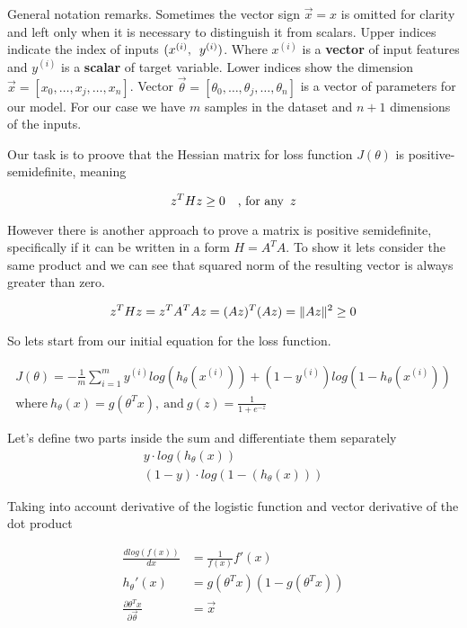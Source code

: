 \documentclass{article}
\DeclarePairedDelimiter{\norm}{\lVert}{\rVert}
\begin{document}
General notation remarks. Sometimes the vector sign $\vec x = x$ is omitted for clarity and left only when it is necessary to distinguish it from scalars. 
Upper indices indicate the index of inputs $(x^{(i)}, \enskip y^{(i)})$. Where $x^{(i)} $ is a {\bf vector} of input features and  $y^{(i)}$ is a {\bf scalar} of target variable.
Lower indices show the dimension  $\vec x = [x_0, \dots, x_j, \dots, x_n]$. Vector $\vec \theta = [\theta_0, \dots, \theta_j, \dots, \theta_n]$ is a vector of parameters for our
model. For our case we have $m$ samples in the dataset and $n + 1$ dimensions of the inputs.

Our task is to proove that the Hessian matrix for loss function $J(\theta)$ is positive-semidefinite, meaning

\[
z^T H z \ge 0
\quad \text {, for any} \enskip z
\]

However there is another approach to prove a matrix is positive semidefinite, specifically if it can be written in a form $H = A^T A$.
To show it lets consider the same product and we can see that squared norm of the resulting vector is always greater than zero.

\[
z^T H z = z^T A^T A z = (Az)^T (Az) = \norm{Az}^2 \ge 0
\]

So lets start from our initial equation for the loss function.

\begin{align}
J(\theta) = - \frac 1m \sum^m_{i=1} y^{(i)} log(h_{\theta}(x^{(i)})) + (1-y^{(i)})log(1-h_{\theta}(x^{(i)})) \\
    \text{where}\ h_{\theta}(x) = g(\theta^Tx),\ \text{and}\ g(z) = \frac{1}{1 + e^{-z}}
\end{align}

Let's define two parts inside the sum and differentiate them separately
\begin{align}
y \cdot log (h_{\theta}(x)) \label{eq:1} \\
(1 - y) \cdot log(1 - (h_{\theta}(x))) \label{eq:2}
\end{align}

Taking into account derivative of the logistic function and vector derivative of the dot product

\begin{align}
\frac {dlog(f(x))}{dx} &= \frac 1{f(x)} f'(x) \\
 h_{\theta}'(x) &= g({\theta^T}x)(1 - g({\theta^T}x)) \\
\frac{\partial\theta^Tx}{\partial\vec{\theta}} &= \vec{x}
\end{align}
\end{document}
